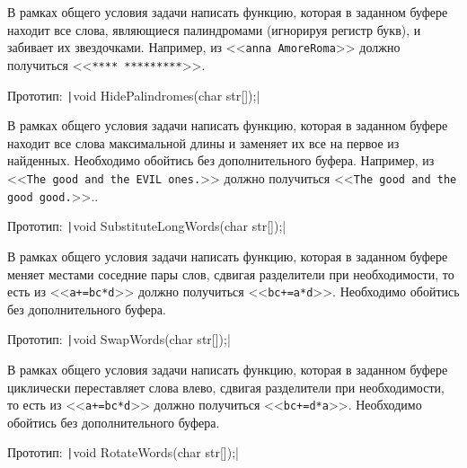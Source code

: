 
\begin{zztask}
В рамках общего условия задачи написать функцию, которая в заданном буфере
находит все слова, являющиеся палиндромами (игнорируя регистр букв), и
забивает их звездочками.
Например, из
<<\texttt{anna AmoreRoma}>>
должно получиться
<<\texttt{**** *********}>>.

Прототип: \texttt|void HidePalindromes(char str[]);|
\end{zztask}


\begin{zztask}
В рамках общего условия задачи написать функцию, которая в заданном буфере
находит все слова максимальной длины и заменяет их все на первое из
найденных.
Необходимо обойтись без дополнительного буфера.
Например, из
<<\texttt{The good and the EVIL ones.}>>
должно получиться
<<\texttt{The good and the good good.}>>..

Прототип: \texttt|void SubstituteLongWords(char str[]);|
\end{zztask}


\begin{zztask}
В рамках общего условия задачи написать функцию, которая в заданном буфере
меняет местами соседние пары слов, сдвигая разделители при необходимости, то
есть из <<\texttt{a+=bc*d}>> должно получиться <<\texttt{bc+=a*d}>>.
Необходимо обойтись без дополнительного буфера.

Прототип: \texttt|void SwapWords(char str[]);|
\end{zztask}


\begin{zztask}
В рамках общего условия задачи написать функцию, которая в заданном буфере
циклически переставляет слова влево, сдвигая разделители при необходимости,
то есть из <<\texttt{a+=bc*d}>> должно получиться <<\texttt{bc+=d*a}>>.
Необходимо обойтись без дополнительного буфера.

Прототип: \texttt|void RotateWords(char str[]);|
\end{zztask}


